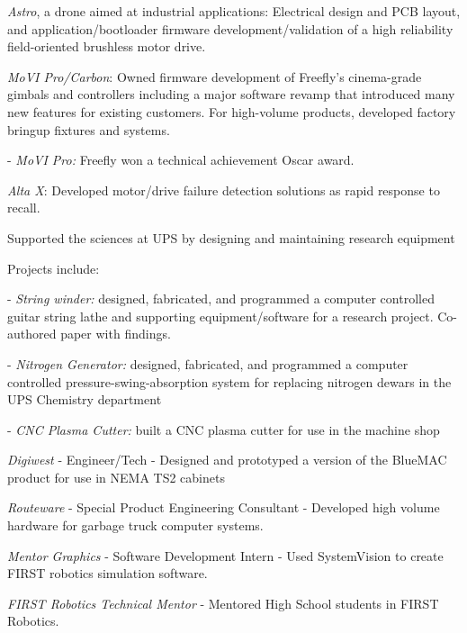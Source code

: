 \documentclass[letterpaper]{deedy-resume} %
\begin{document}
\begin{minipage}[t]{0.66\textwidth}
\begin{tightitemize}
\item \textit{Astro}, a drone aimed at industrial applications: Electrical design and PCB layout, and application/bootloader firmware development/validation of a high reliability field-oriented brushless motor drive. 

\item \textit{MoVI Pro/Carbon}: Owned firmware development of Freefly's cinema-grade gimbals and controllers including a major software revamp that introduced many new features for existing customers.  For high-volume products, developed factory bringup fixtures and systems.  

- \textit{MoVI Pro:} Freefly won a technical achievement Oscar award.

\item \textit{Alta X}:  Developed motor/drive failure detection solutions as rapid response to recall.

\end{tightitemize}
\vspace{\topsep} %

\begin{tightitemize}
\item Supported the sciences at UPS by designing and maintaining research equipment
\item Projects include:

- \textit{String winder:} designed, fabricated, and programmed a computer controlled guitar string lathe and supporting equipment/software for a research project.  Co-authored paper with findings.

- \textit{Nitrogen Generator:} designed, fabricated, and programmed a computer controlled pressure-swing-absorption system for replacing nitrogen dewars in the UPS Chemistry department

- \textit{CNC Plasma Cutter:} built a CNC plasma cutter for use in the machine shop
\end{tightitemize}

\vspace{\topsep} %

\begin{tightitemize}
\item \textit{Digiwest} - Engineer/Tech -  Designed and prototyped a version of the BlueMAC product for use in NEMA TS2 cabinets
\item \textit{Routeware} - Special Product Engineering Consultant - Developed high volume hardware for garbage truck computer systems.
\item \textit{Mentor Graphics} - Software Development Intern - Used SystemVision to create FIRST robotics simulation software.
\item \textit{FIRST Robotics Technical Mentor} - Mentored High School students in FIRST Robotics.


\end{tightitemize}
\end{minipage}
\end{document}
